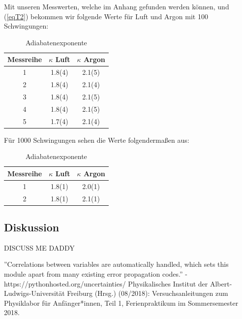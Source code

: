 \documentclass[11pt,a4paper]{article}
\begin{document}
Mit unseren Messwerten, welche im Anhang gefunden werden k\"onnen, und (\ref{eqT2}) bekommen wir folgende Werte f\"ur Luft und Argon mit 100 Schwingungen:

\begin{table}[h]
\centering
\renewcommand\thetable{T1}
\caption{Adiabatenexponente}
\vspace{11pt}
\begin{tabular}{ccc}
\toprule
Messreihe & $\kappa$ Luft &  $\kappa$ Argon\\
\midrule
1 & 1.8(4) & 2.1(5)\\
2 & 1.8(4) & 2.1(4)\\
3 & 1.8(4) & 2.1(5)\\
4 & 1.8(4) & 2.1(5)\\
5 & 1.7(4) & 2.1(4)\\
\bottomrule 
\end{tabular}
\label{tab:B1}
\end{table}

F\"ur 1000 Schwingungen sehen die Werte folgenderma\ss en aus:

\begin{table}[h]
\centering
\renewcommand\thetable{T1}
\caption{Adiabatenexponente}
\vspace{11pt}
\begin{tabular}{ccc}
\toprule
Messreihe & $\kappa$ Luft &  $\kappa$ Argon\\
\midrule
1 & 1.8(1) & 2.0(1)\\
2 & 1.8(1) & 2.1(1)\\
\bottomrule 
\end{tabular}
\label{tab:B1}
\end{table}

\pagebreak

\subsection{Diskussion}

DISCUSS ME DADDY

\vfill

\begin{thebibliography}{9}
 ''Correlations between variables are automatically handled, which sets this module apart from many existing error propagation codes.'' - https://pythonhosted.org/uncertainties/
  Physikalisches Institut der Albert-Ludwigs-Universität Freiburg (Hrsg.) (08/2018): Versuchsanleitungen zum Physiklabor für Anfänger*innen, Teil 1, Ferienpraktikum im Sommersemester 2018.
 \end{thebibliography}
\end{document}
